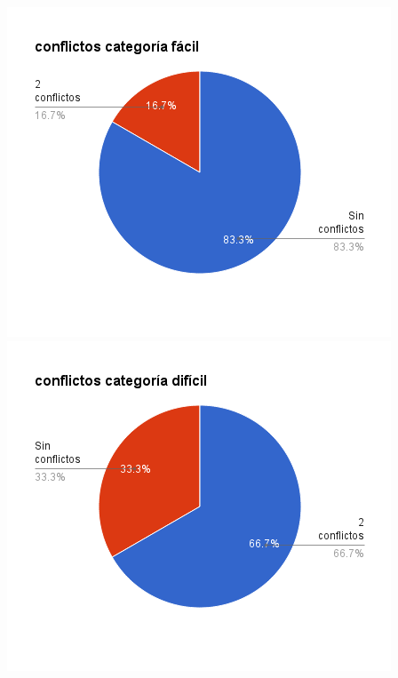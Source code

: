 \documentclass[a4paper,spanish]{article}
\begin{document}
\noindent
\begin{minipage}{0.50\textwidth}
	\includegraphics[width=\textwidth]{./graficos/conflictosFacil.png}
	\includegraphics[width=\textwidth]{./graficos/conflictosDificil.png}
	\label{G}
\end{minipage}
\end{document}
